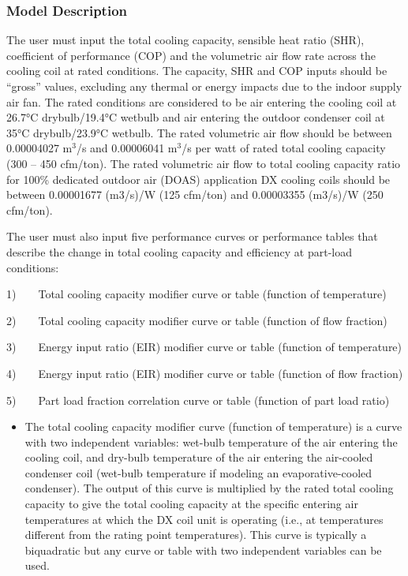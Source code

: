 \subsubsection{Model Description}\label{model-description-2-004}

The user must input the total cooling capacity, sensible heat ratio (SHR), coefficient of performance (COP) and the volumetric air flow rate across the cooling coil at rated conditions. The capacity, SHR and COP inputs should be ``gross'' values, excluding any thermal or energy impacts due to the indoor supply air fan. The rated conditions are considered to be air entering the cooling coil at 26.7°C drybulb/19.4°C wetbulb and air entering the outdoor condenser coil at 35°C drybulb/23.9°C wetbulb. The rated volumetric air flow should be between 0.00004027 m\(^{3}\)/s and 0.00006041 m\(^{3}\)/s per watt of rated total cooling capacity (300 -- 450 cfm/ton). The rated volumetric air flow to total cooling capacity ratio for 100\% dedicated outdoor air (DOAS) application DX cooling coils should be between 0.00001677 (m3/s)/W (125 cfm/ton) and 0.00003355 (m3/s)/W (250 cfm/ton).

The user must also input five performance curves or performance tables that describe the change in total cooling capacity and efficiency at part-load conditions:

1)~~~~Total cooling capacity modifier curve or table (function of temperature)

2)~~~~Total cooling capacity modifier curve or table (function of flow fraction)

3)~~~~Energy input ratio (EIR) modifier curve or table (function of temperature)

4)~~~~Energy input ratio (EIR) modifier curve or table (function of flow fraction)

5)~~~~Part load fraction correlation curve or table (function of part load ratio)

\begin{itemize}
\tightlist
\item
  The total cooling capacity modifier curve (function of temperature) is a curve with two independent variables: wet-bulb temperature of the air entering the cooling coil, and dry-bulb temperature of the air entering the air-cooled condenser coil (wet-bulb temperature if modeling an evaporative-cooled condenser). The output of this curve is multiplied by the rated total cooling capacity to give the total cooling capacity at the specific entering air temperatures at which the DX coil unit is operating (i.e., at temperatures different from the rating point temperatures). This curve is typically a biquadratic but any curve or table with two independent variables can be used.
\end{itemize}

